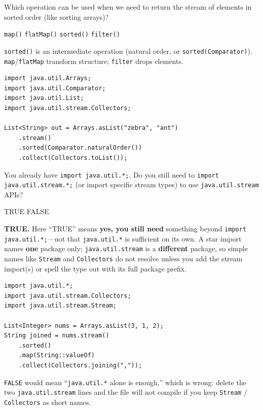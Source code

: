 \question[4]
Which operation can be used when we need to return the stream of elements in sorted order (like sorting arrays)?
\begin{choices}
  \choice \texttt{map()}
  \choice \texttt{flatMap()}
  \CorrectChoice \texttt{sorted()}
  \choice \texttt{filter()}
\end{choices}
\begin{solution}
  \texttt{sorted()} is an intermediate operation (natural order, or \texttt{sorted(Comparator)}). \texttt{map}/\texttt{flatMap} transform structure; \texttt{filter} drops elements.

\begin{lstlisting}[style=java]
import java.util.Arrays;
import java.util.Comparator;
import java.util.List;
import java.util.stream.Collectors;

List<String> out = Arrays.asList("zebra", "ant")
    .stream()
    .sorted(Comparator.naturalOrder())
    .collect(Collectors.toList());
\end{lstlisting}
\end{solution}

\question[4]
You already have \lstinline!import java.util.*;!. Do you still need to \lstinline!import java.util.stream.*;! (or import specific stream types) to use \texttt{java.util.stream} APIs?
\begin{choices}
  \CorrectChoice TRUE
  \choice FALSE
\end{choices}
\begin{solution}
  \textbf{TRUE.} Here ``TRUE'' means \textbf{yes, you still need} something beyond \texttt{import java.util.*;}---not that \texttt{java.util.*} is sufficient on its own. A star import names \textbf{one} package only; \texttt{java.util.stream} is a \textbf{different} package, so simple names like \texttt{Stream} and \texttt{Collectors} do not resolve unless you add the stream import(s) or spell the type out with its full package prefix.

\begin{lstlisting}[style=java]
import java.util.*;
import java.util.stream.Collectors;
import java.util.stream.Stream;

List<Integer> nums = Arrays.asList(3, 1, 2);
String joined = nums.stream()
    .sorted()
    .map(String::valueOf)
    .collect(Collectors.joining(","));
\end{lstlisting}

  \texttt{FALSE} would mean ``\texttt{java.util.*} alone is enough,'' which is wrong: delete the two \texttt{java.util.stream} lines and the file will not compile if you keep \texttt{Stream} / \texttt{Collectors} as short names.
\end{solution}

